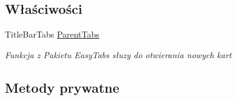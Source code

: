 \subsection*{Właściwości}
\begin{DoxyCompactItemize}
\item 
Title\+Bar\+Tabs \mbox{\hyperlink{class_proj__przegladarka_1_1_form1_af95b96451eb281101ff02dca5edd6ef3}{Parent\+Tabs}}
\begin{DoxyCompactList}\small\item\em Funkcja z Pakietu Easy\+Tabs słuzy do otwierania nowych kart \end{DoxyCompactList}\end{DoxyCompactItemize}
\subsection*{Metody prywatne}
